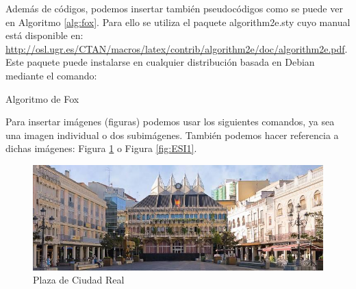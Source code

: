 \documentclass[11pt]{article}
\begin{document}
Además de códigos, podemos insertar también pseudocódigos como se puede ver en Algoritmo \ref{alg:fox}. Para ello se utiliza el paquete algorithm2e.sty cuyo manual está disponible en: \url{http://osl.ugr.es/CTAN/macros/latex/contrib/algorithm2e/doc/algorithm2e.pdf}. Este paquete puede instalarse en cualquier distribución basada en Debian mediante el comando:

\IncMargin{1em}
\begin{algorithm}
	\LinesNumbered
	\SetAlgoLined



	\caption{Algoritmo de Fox}\label{alg:fox}
\end{algorithm}\DecMargin{1em}

Para insertar imágenes (figuras) podemos usar los siguientes comandos, ya sea una imagen individual o dos subimágenes. También podemos hacer referencia a dichas imágenes: Figura \ref{fig:PlazaCR} o Figura \ref{fig:ESI1}.

\begin{figure}[H] %
	\centering
	\includegraphics[width=1\linewidth,angle=0]{PlazaCR}
	\caption{Plaza de Ciudad Real}
	\label{fig:PlazaCR}
\end{figure}
\end{document}
